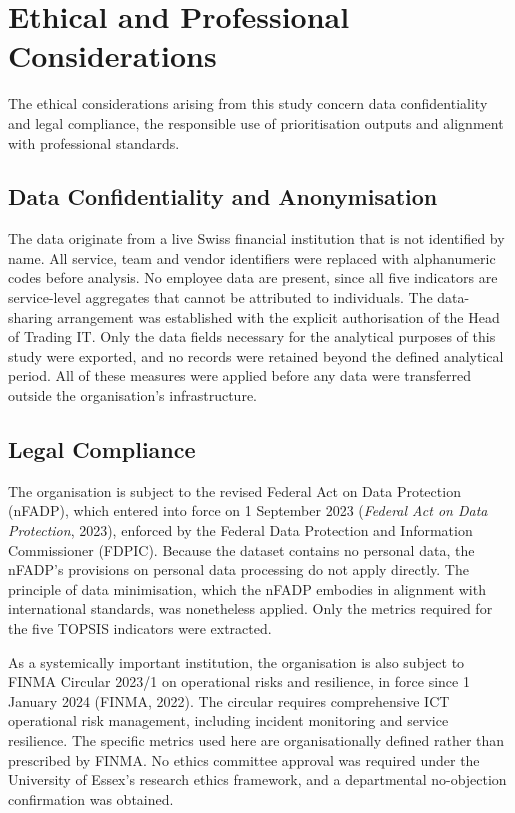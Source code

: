 \documentclass[
  12pt,
  letterpaper,
  12pt,
  oneside,
  english,
  onehalfspacing,
  headsepline]{MastersDoctoralThesis}
\begin{document}
\section{Ethical and Professional Considerations}\label{sec-ethics}

The ethical considerations arising from this study concern data
confidentiality and legal compliance, the responsible use of
prioritisation outputs and alignment with professional standards.

\subsection{Data Confidentiality and
Anonymisation}\label{data-confidentiality-and-anonymisation}

The data originate from a live Swiss financial institution that is not
identified by name. All service, team and vendor identifiers were
replaced with alphanumeric codes before analysis. No employee data are
present, since all five indicators are service-level aggregates that
cannot be attributed to individuals. The data-sharing arrangement was
established with the explicit authorisation of the Head of Trading IT.
Only the data fields necessary for the analytical purposes of this study
were exported, and no records were retained beyond the defined
analytical period. All of these measures were applied before any data
were transferred outside the organisation's infrastructure.

\subsection{Legal Compliance}\label{legal-compliance}

The organisation is subject to the revised Federal Act on Data
Protection (nFADP), which entered into force on 1 September 2023
(\emph{Federal {Act} on {Data Protection}}, 2023), enforced by the
Federal Data Protection and Information Commissioner (FDPIC). Because
the dataset contains no personal data, the nFADP's provisions on
personal data processing do not apply directly. The principle of data
minimisation, which the nFADP embodies in alignment with international
standards, was nonetheless applied. Only the metrics required for the
five TOPSIS indicators were extracted.

As a systemically important institution, the organisation is also
subject to FINMA Circular 2023/1 on operational risks and resilience, in
force since 1 January 2024 (FINMA, 2022). The circular requires
comprehensive ICT operational risk management, including incident
monitoring and service resilience. The specific metrics used here are
organisationally defined rather than prescribed by FINMA. No ethics
committee approval was required under the University of Essex's research
ethics framework, and a departmental no-objection confirmation was
obtained.
\end{document}

